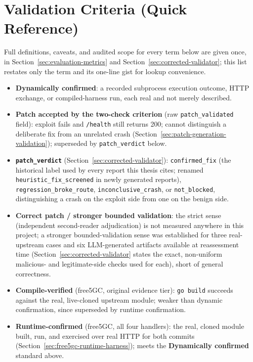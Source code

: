 \documentclass[12pt,a4paper]{report}
\begin{document}
\section{Validation Criteria (Quick Reference)}

Full definitions, caveats, and audited scope for every term below are given once, in Section~\ref{sec:evaluation-metrics} and Section~\ref{sec:corrected-validator}; this list restates only the term and its one-line gist for lookup convenience.

\begin{itemize}
\item \textbf{Dynamically confirmed}: a recorded subprocess execution outcome, HTTP exchange, or compiled-harness run, each real and not merely described.
\item \textbf{Patch accepted by the two-check criterion} (raw \texttt{patch\_validated} field): exploit fails and \texttt{/health} still returns 200; cannot distinguish a deliberate fix from an unrelated crash (Section~\ref{sec:patch-generation-validation}); superseded by \texttt{patch\_verdict} below.
\item \textbf{\texttt{patch\_verdict}} (Section~\ref{sec:corrected-validator}): \texttt{confirmed\_fix} (the historical label used by every report this thesis cites; renamed \texttt{heuristic\_fix\_screened} in newly generated reports), \texttt{regression\_broke\_route}, \texttt{inconclusive\_crash}, or \texttt{not\_blocked}, distinguishing a crash on the exploit side from one on the benign side.
\item \textbf{Correct patch / stronger bounded validation}: the strict sense (independent second-reader adjudication) is not measured anywhere in this project; a stronger bounded-validation sense was established for three real-upstream cases and six LLM-generated artifacts available at reassessment time (Section~\ref{sec:corrected-validator} states the exact, non-uniform malicious- and legitimate-side checks used for each), short of general correctness.
\item \textbf{Compile-verified} (free5GC, original evidence tier): \texttt{go build} succeeds against the real, live-cloned upstream module; weaker than dynamic confirmation, since superseded by runtime confirmation.
\item \textbf{Runtime-confirmed} (free5GC, all four handlers): the real, cloned module built, run, and exercised over real HTTP for both commits (Section~\ref{sec:free5gc-runtime-harness}); meets the \textbf{Dynamically confirmed} standard above.
\end{itemize}
\end{document}
